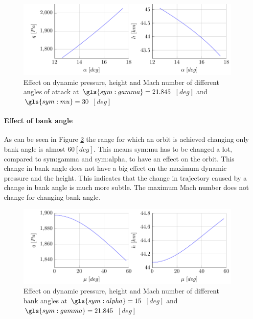 \begin{figure}[h]
	\centering
	\includegraphics[width=\textwidth]{./Figure/orbit/effectalpha2.pdf}
	\caption[Effect on dynamic pressure, height and Mach number of different angles of attack]{Effect on dynamic pressure, height and Mach number of different angles of attack at $\gls{sym:gamma}=21.845$ $\left[deg\right]$ and $\gls{sym:mu}=30$ $\left[deg\right]$}
	\label{fig:effectalpha}
\end{figure}

\paragraph{Effect of bank angle}

As can be seen in Figure \ref{fig:effectmu} the range for which an orbit is achieved changing only bank angle is almost $60 \left[deg\right]$. This means \gls{sym:mu} has to be changed a lot, compared to \gls{sym:gamma} and \gls{sym:alpha}, to have an effect on the orbit. This change in bank angle does not have a big effect on the maximum dynamic pressure and the height. This indicates that the change in trajectory caused by a change in bank angle is much more subtle. The maximum Mach number does not change for changing bank angle.

\begin{figure}[h]
	\centering
	\includegraphics[width=\textwidth]{./Figure/orbit/effectmu2.pdf}
	\caption[Effect on dynamic pressure, height and Mach number of different bank angles]{Effect on dynamic pressure, height and Mach number of different bank angles at $\gls{sym:alpha}=15$ $\left[deg\right]$ and $\gls{sym:gamma}=21.845$ $\left[deg\right]$}
	\label{fig:effectmu}
\end{figure}